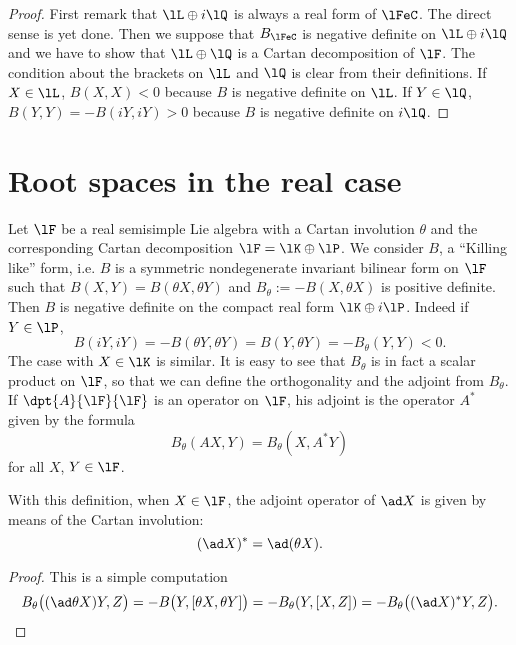 \begin{proof}
First remark that $\lL\oplus i\lQ$ is always a real form of $\lFeC$. The direct sense is yet done. Then we suppose that $B_{\lFeC}$ is negative definite on $\lL\oplus i\lQ$ and we have to show that $\lL\oplus\lQ$ is a Cartan decomposition of $\lF$. The condition about the brackets on $\lL$ and $\lQ$ is clear from their definitions. If $X\in\lL$, $B(X,X)<0$ because $B$ is negative definite on $\lL$. If $Y\in\lQ$, $B(Y,Y)=-B(iY,iY)>0$ because $B$ is negative definite on $i\lQ$.
\end{proof}

\section{Root spaces in the real case}

Let $\lF$ be a real semisimple Lie algebra with a Cartan involution $\theta$ and the corresponding Cartan decomposition $\lF=\lK\oplus\lP$. We consider $B$, a ``Killing like''{} form, i.e. $B$ is a symmetric nondegenerate invariant bilinear form on $\lF$ such that $B(X,Y)=B(\theta X,\theta Y)$ and $B_{\theta}:=-B(X,\theta X)$ is positive definite. Then $B$ is negative definite on the compact real form $\lK\oplus i\lP$. Indeed if $Y\in\lP$,
\begin{equation}
  B(iY,iY)=-B(\theta Y,\theta Y)
          =B(Y,\theta Y)
      =-B_{\theta}(Y,Y)<0.
\end{equation}
The case with $X\in\lK$ is similar. It is easy to see that $B_{\theta}$ is in fact a scalar product on $\lF$, so that we can define the orthogonality and the adjoint from $B_{\theta}$. If $\dpt{A}{\lF}{\lF}$ is an operator on $\lF$, his adjoint is the operator $A^*$ given by the formula
\[
   B_{\theta}(A X,Y)=B_{\theta}(X,A^*Y)
\]
for all $X$, $Y\in\lF$.

\begin{proposition}
With this definition, when $X\in\lF$, the adjoint operator of $\ad X$ is given by means of the Cartan involution:
\[
(\ad X)^*= \ad(\theta X).
\]
\end{proposition}

\begin{proof}
This is a simple computation
\begin{equation}
B_{\theta}\big(  (\ad\theta X)Y,Z \big)=-B\big(  Y,[\theta X,\theta Y]  \big)
                                     =-B_{\theta}(Y,[X,Z])
                     =-B_{\theta}\big( (\ad X)^*Y,Z \big).
\end{equation}
\end{proof}

